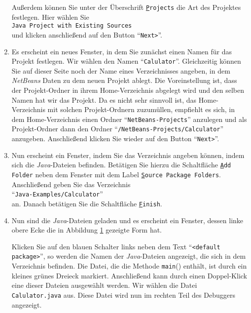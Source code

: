 \documentclass{article}
\begin{document}
\begin{enumerate}
      Au{\ss}erdem k\"onnen Sie unter der Überschrift \texttt{\underline{P}rojects}
      die Art des Projektes festlegen.  Hier w\"ahlen Sie \\[0.1cm]
      \hspace*{1.3cm} \texttt{Java Project with Existing Sources} \\[0.1cm]
      und klicken anschlie{\ss}end auf den Button ``\texttt{Next>}''.
\item Es erscheint ein neues Fenster, in dem Sie zun\"achst einen Namen f\"ur das Projekt festlegen.
      Wir w\"ahlen den Namen ``\texttt{Calulator}''.
      Gleichzeitig k\"onnen Sie auf dieser Seite noch der Name eines Verzeichnisses angeben,
      in dem \textsl{NetBeans} Daten zu dem neuen Projekt ablegt. 
      Die Voreinstellung ist, dass der Projekt-Ordner in ihrem Home-Verzeichnis  
      abgelegt wird und den selben Namen hat wir das Projekt.  Da es nicht sehr sinnvoll
      ist, das Home-Verzeichnis mit solchen Projekt-Ordnern zuzum\"ullen, empfiehlt es sich,
      in dem Home-Verzeichnis einen Ordner ``\texttt{NetBeans-Projects}'' anzulegen und als
      Projekt-Ordner dann den Ordner ``\texttt{/NetBeans-Projects/Calculator}''
      anzugeben.   Anschlie{\ss}end klicken Sie wieder auf den Button ``\texttt{Next>}''.
\item Nun erscheint ein Fenster, indem Sie das Verzeichnis angeben k\"onnen, indem sich die
      \textsl{Java}-Dateien befinden.  Bet\"atigen Sie hierzu die Schaltfl\"ache
      \texttt{\underline{A}dd Folder} neben dem Fenster mit dem Label
      \texttt{\underline{S}ource Package Folders}.
      Anschlie{\ss}end geben Sie das Verzeichnis \\[0.1cm]
      \hspace*{1.3cm} 
      ``\texttt{Java-Examples/Calculator}'' \\[0.1cm]
      an. Danach bet\"atigen Sie die
      Schaltfl\"ache \texttt{\underline{F}inish}.
\item Nun sind die \textsl{Java}-Dateien geladen und es erscheint ein Fenster,
      dessen linke obere Ecke die in Abbildung \ref{fig:left} gezeigte Form hat.
\begin{figure}[!h]
  \centering
  \label{fig:left}
\end{figure}
      Klicken Sie auf den blauen Schalter links neben dem Text ``\texttt{<default package>}'',
      so werden die Namen der \textsl{Java}-Dateien angezeigt, die sich in dem Verzeichnis
      befinden.  Die Datei, die die Methode \texttt{main}() enth\"alt, ist durch ein kleines
      gr\"unes Dreieck markiert.
      Anschlie{\ss}end kann durch einen Doppel-Klick eine dieser Dateien ausgew\"ahlt werden.
      Wir w\"ahlen die Datei \texttt{Calulator.java} aus.  Diese Datei wird nun im rechten
      Teil des Debuggers angezeigt. 
\end{enumerate}
\end{document}
